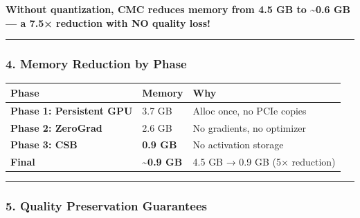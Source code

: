\documentclass[
  11pt,
  a4paper,
]{article}
\begin{document}
\textbf{Without quantization, CMC reduces memory from 4.5 GB to
\textasciitilde0.6 GB --- a 7.5× reduction with NO quality loss!}

\begin{center}\rule{0.5\linewidth}{0.5pt}\end{center}

\subsubsection{4. Memory Reduction by
Phase}\label{memory-reduction-by-phase}

\begin{longtable}[]{@{}lll@{}}
\toprule\noalign{}
Phase & Memory & Why \\
\midrule\noalign{}
\endhead
\bottomrule\noalign{}
\endlastfoot
\textbf{Phase 1: Persistent GPU} & 3.7 GB & Alloc once, no PCIe
copies \\
\textbf{Phase 2: ZeroGrad} & 2.6 GB & No gradients, no optimizer \\
\textbf{Phase 3: CSB} & \textbf{0.9 GB} & No activation storage \\
\textbf{Final} & \textbf{\textasciitilde0.9 GB} & 4.5 GB → 0.9 GB (5×
reduction) \\
\end{longtable}

\begin{center}\rule{0.5\linewidth}{0.5pt}\end{center}

\subsubsection{5. Quality Preservation
Guarantees}\label{quality-preservation-guarantees}
\end{document}
